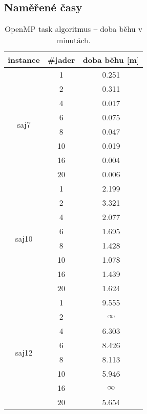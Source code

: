 \documentclass{article}
\begin{document}
    \subsection{Naměřené časy}

    \begin{table}[h]
        \centering
        \begin{tabular}{|c|c|c|}
            \hline
            \multicolumn{1}{|l|}{\textbf{instance}} & \multicolumn{1}{l|}{\textbf{\#jader}} & \textbf{doba běhu} {[}m{]} \\ \hline
            \multirow{8}{*}{saj7}  & 1  & 0.251 \\
            & 2  & 0.311 \\
            & 4  & 0.017 \\
            & 6  & 0.075 \\
            & 8  & 0.047 \\
            & 10 & 0.019 \\
            & 16 & 0.004 \\
            & 20 & 0.006 \\ \hline
            \multirow{8}{*}{saj10} & 1  & 2.199 \\
            & 2  & 3.321 \\
            & 4  & 2.077 \\
            & 6  & 1.695 \\
            & 8  & 1.428 \\
            & 10 & 1.078 \\
            & 16 & 1.439 \\
            & 20 & 1.624 \\ \hline
            \multirow{8}{*}{saj12} & 1  & 9.555 \\
            & 2  & $\infty$   \\
            & 4  & 6.303 \\
            & 6  & 8.426 \\
            & 8  & 8.113 \\
            & 10 & 5.946 \\
            & 16 & $\infty$   \\
            & 20 & 5.654 \\ \hline
        \end{tabular}
        \caption{OpenMP task algoritmus -- doba běhu v minutách.}
        \label{tab:openmp-task}
    \end{table}
\end{document}
